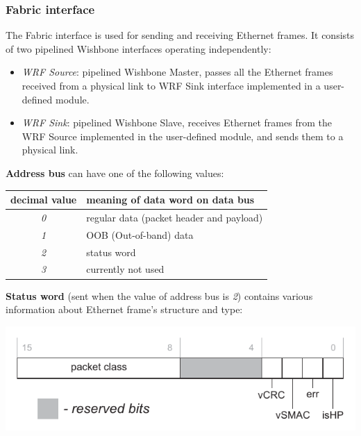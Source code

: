 \subsubsection{Fabric interface}
\label{sec:wrpc_fabric}


The Fabric interface is used for sending and receiving Ethernet frames. It consists 
of two pipelined Wishbone interfaces operating independently: 

\begin{itemize}
  \item \emph{WRF Source}: pipelined Wishbone Master, passes all the Ethernet frames
    received from a physical link to WRF Sink interface implemented in a
    user-defined module.
  \item \emph{WRF Sink}: pipelined Wishbone Slave, receives Ethernet frames from
    the WRF Source implemented in the user-defined module, and sends them to a
    physical link.
\end{itemize}

{\bf Address bus} can have one of the following values:

\begin{center}
\begin{tabular}{|c|l|}
  \hline {\bf decimal value} & {\bf meaning of data word on data bus}\\
  \hline
  \emph{0} & regular data (packet header and payload)\\
  \emph{1} & OOB (Out-of-band) data\\
  \emph{2} & status word\\
  \emph{3} & currently not used\\
  \hline
\end{tabular}
\end{center}

{\bf Status word} (sent when the value of address bus is \emph{2}) contains
various information about Ethernet frame's structure and type:
  \begin{center}
    \includegraphics[width=.6\textwidth]{fig/status.pdf}
  \end{center}

